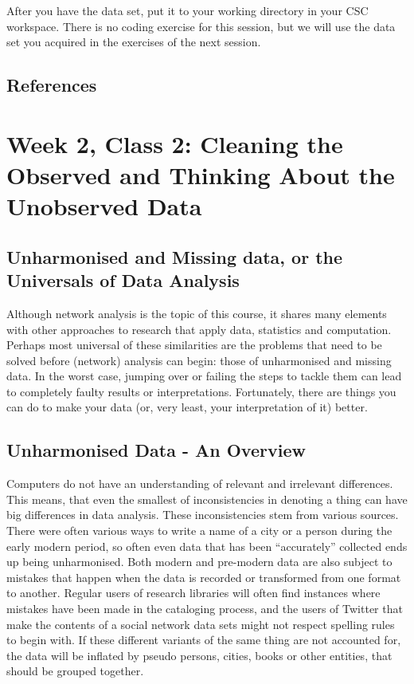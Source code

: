 \documentclass[
]{book}
\begin{document}
After you have the data set, put it to your working directory in your CSC workspace. There is no coding exercise for this session,
but we will use the data set you acquired in the exercises of the next session.

\hypertarget{references}{%
\section{References}\label{references}}

\hypertarget{week-2-class-2-cleaning-the-observed-and-thinking-about-the-unobserved-data}{%
\chapter{Week 2, Class 2: Cleaning the Observed and Thinking About the Unobserved Data}\label{week-2-class-2-cleaning-the-observed-and-thinking-about-the-unobserved-data}}

\hypertarget{unharmonised-and-missing-data-or-the-universals-of-data-analysis}{%
\section{Unharmonised and Missing data, or the Universals of Data Analysis}\label{unharmonised-and-missing-data-or-the-universals-of-data-analysis}}

Although network analysis is the topic of this course, it shares many elements with other approaches to research that apply data, statistics and computation. Perhaps most universal of these similarities are the problems that need to be solved before (network) analysis can begin: those of unharmonised and missing data. In the worst case, jumping over or failing the steps to tackle them can lead to completely faulty results or interpretations. Fortunately, there are things you can do to make your data (or, very least, your interpretation of it) better.

\hypertarget{unharmonised-data---an-overview}{%
\section{Unharmonised Data - An Overview}\label{unharmonised-data---an-overview}}

Computers do not have an understanding of relevant and irrelevant differences. This means, that even the smallest of inconsistencies in denoting a thing can have big differences in data analysis. These inconsistencies stem from various sources. There were often various ways to write a name of a city or a person during the early modern period, so often even data that has been ``accurately'' collected ends up being unharmonised. Both modern and pre-modern data are also subject to mistakes that happen when the data is recorded or transformed from one format to another. Regular users of research libraries will often find instances where mistakes have been made in the cataloging process, and the users of Twitter that make the contents of a social network data sets might not respect spelling rules to begin with. If these different variants of the same thing are not accounted for, the data will be inflated by pseudo persons, cities, books or other entities, that should be grouped together.
\end{document}
